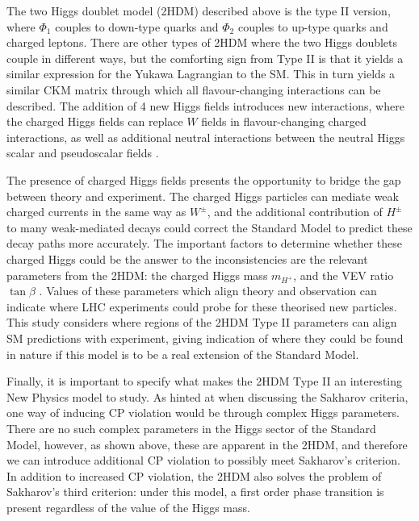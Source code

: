 \documentclass[a4paper,12pt]{article}
\begin{document}
The two Higgs doublet model (2HDM) described above is the type II version, where $\Phi_1$ couples to down-type quarks and $\Phi_2$ couples to up-type quarks and charged leptons. 
There are other types of 2HDM where the two Higgs doublets couple in different ways, but the comforting sign from Type II is that it yields a similar expression for the Yukawa Lagrangian to the SM. 
This in turn yields a similar CKM matrix through which all flavour-changing interactions can be described. 
The addition of 4 new Higgs fields introduces new interactions, where the charged Higgs fields can replace $W$ fields in flavour-changing charged interactions, as well as additional neutral interactions between the neutral Higgs scalar and pseudoscalar fields \cite{branco}. 

The presence of charged Higgs fields presents the opportunity to bridge the gap between theory and experiment. 
The charged Higgs particles can mediate weak charged currents in the same way as $W^{\pm}$, and the additional contribution of $H^{\pm}$ to many weak-mediated decays could correct the Standard Model to predict these decay paths \cite{branco} more accurately. 
The important factors to determine whether these charged Higgs could be the answer to the inconsistencies are the relevant parameters from the 2HDM: the charged Higgs mass $m_{H^+}$, and the VEV ratio $\tan\beta$ \cite{desc}. 
Values of these parameters which align theory and observation can indicate where LHC experiments could probe for these theorised new particles. 
This study considers where regions of the 2HDM Type II parameters can align SM predictions with experiment, giving indication of where they could be found in nature if this model is to be a real extension of the Standard Model.

Finally, it is important to specify what makes the 2HDM Type II an interesting New Physics model to study. 
As hinted at when discussing the Sakharov criteria, one way of inducing CP violation would be through complex Higgs parameters. 
There are no such complex parameters in the Higgs sector of the Standard Model, however, as shown above, these are apparent in the 2HDM, and therefore we can introduce additional CP violation to possibly meet Sakharov's criterion. 
In addition to increased CP violation, the 2HDM also solves the problem of Sakharov's third criterion: under this model, a first order phase transition is present regardless of the value of the Higgs mass. 
\end{document}
